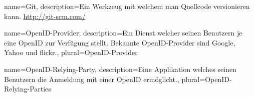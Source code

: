{
    name=Git,
    description={Ein Werkzeug mit welchem man Quellcode versionieren kann. \url{http://git-scm.com/}}
}

{
    name=OpenID-Provider,
    description={Ein Dienst welcher seinen Benutzern je eine OpenID zur Verfügung stellt. Bekannte OpenID-Provider sind Google, Yahoo und flickr.},
    plural=OpenID-Provider
}

{
    name=OpenID-Relying-Party,
    description={Eine Applikation welches seinen Benutzern die Anmeldung mit
                 einer OpenID ermöglicht.},
    plural=OpenID-Relying-Parties 
}

